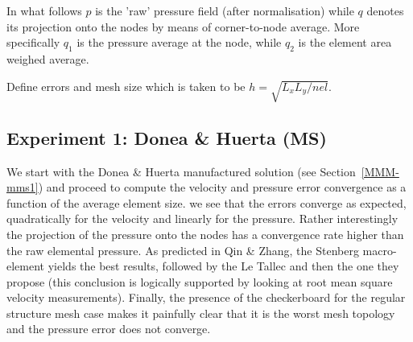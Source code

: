 In what follows $p$ is the 'raw' pressure field (after normalisation)
while $q$ denotes its projection onto the nodes by means of corner-to-node average.
More specifically $q_1$ is the pressure average at the node, 
while $q_2$  is the element area weighed average.

Define errors and mesh size which is taken to be $h = \sqrt{L_xL_y/nel}$. 


\newpage
\subsection*{Experiment 1: Donea \& Huerta (MS)}

We start with the Donea \& Huerta manufactured solution (see Section~\ref{MMM-mms1}) and 
proceed to compute the velocity and pressure error convergence as a function of the 
average element size.
we see that the errors converge as expected, quadratically for the velocity and linearly for the pressure.
Rather interestingly the projection of the pressure onto the nodes has a convergence rate 
higher than the raw elemental pressure. As predicted in Qin \& Zhang, the Stenberg macro-element 
yields the best results, followed by the Le Tallec and then the one they propose (this conclusion 
is logically supported by looking at root mean square velocity measurements). 
Finally, the presence of the checkerboard for the regular structure mesh case
makes it painfully clear that it is the worst mesh topology 
and the pressure error does not converge.  

